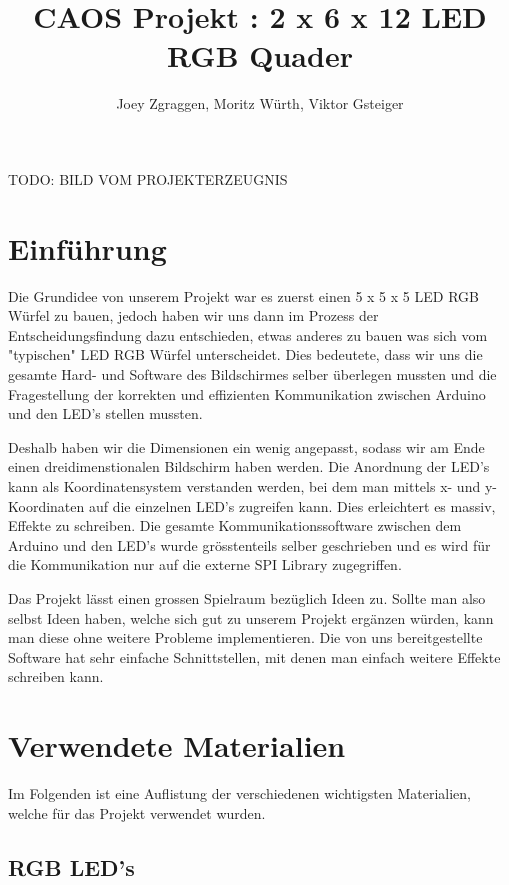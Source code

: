 \documentclass[12pt,a4paper]{article}
\title{\textbf{CAOS Projekt : 2 x 6 x 12 LED RGB Quader}}
\author{Joey Zgraggen, Moritz Würth, Viktor Gsteiger}
\begin{document}
\renewcommand\contentsname{Inhaltsverzeichnis}
\begin{titlepage}
\maketitle
TODO: BILD VOM PROJEKTERZEUGNIS
\end{titlepage}
\tableofcontents
\newpage

\section{Einführung}

Die Grundidee von unserem Projekt war es zuerst einen 5 x 5 x 5 LED RGB Würfel zu bauen, jedoch haben wir uns dann im Prozess der Entscheidungsfindung
dazu entschieden, etwas anderes zu bauen was sich vom "typischen" LED RGB Würfel unterscheidet. Dies bedeutete, dass wir uns die gesamte Hard- und Software des Bildschirmes selber überlegen mussten und die Fragestellung der korrekten und effizienten Kommunikation zwischen Arduino und den LED's stellen mussten.

Deshalb haben wir die Dimensionen ein wenig angepasst, sodass wir am Ende einen dreidimenstionalen Bildschirm haben werden. Die Anordnung der LED's kann als Koordinatensystem verstanden werden, bei dem man mittels x- und y-Koordinaten auf die einzelnen LED's zugreifen kann. Dies erleichtert es massiv, Effekte zu schreiben. Die gesamte Kommunikationssoftware zwischen dem Arduino und den LED's wurde grösstenteils selber geschrieben und es wird für die Kommunikation nur auf die externe SPI Library zugegriffen\cite{SPI}.

Das Projekt lässt einen grossen Spielraum bezüglich Ideen zu. Sollte man also selbst Ideen haben, welche sich gut zu unserem Projekt ergänzen würden, kann man diese ohne weitere Probleme implementieren. Die von uns bereitgestellte Software hat sehr einfache Schnittstellen, mit denen man einfach weitere Effekte schreiben kann\cite{readMeCode}.


\section{Verwendete Materialien}

Im Folgenden ist eine Auflistung der verschiedenen wichtigsten Materialien, welche für das Projekt verwendet wurden.

\subsection{RGB LED's}
\end{document}
